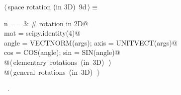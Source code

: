 \documentclass[11pt,oneside]{article}	%
\begin{document}
\begin{flushleft} \small \label{scrap21}
\protect{}$\langle\,$space rotation (in 3D)\nobreak\ {\footnotesize 9d}$\,\rangle\equiv$
\vspace{-1ex}
\begin{list}{}{} \item
\mbox{}\verb@if n == 3: # rotation in 2D@\\
\mbox{}\verb@   mat = scipy.identity(4)@\\
\mbox{}\verb@   angle = VECTNORM(args); axis = UNITVECT(args)@\\
\mbox{}\verb@   cos = COS(angle); sin = SIN(angle)@\\
\mbox{}\verb@   @\hbox{$\langle\,$elementary rotations (in 3D)\nobreak\ {\footnotesize {}}$\,\rangle$}\verb@@\\
\mbox{}\verb@   @\hbox{$\langle\,$general rotations (in 3D)\nobreak\ {\footnotesize {}}$\,\rangle$}\verb@@\\
\mbox{}\verb@@{\NWsep}
\end{list}
\vspace{-1ex}
\footnotesize\addtolength{\baselineskip}{-1ex}
\begin{list}{}{\setlength{\itemsep}{-\parsep}\setlength{\itemindent}{-\leftmargin}}
\item \NWtxtMacroRefIn\ .
\end{list}
\end{flushleft}
\end{document}
